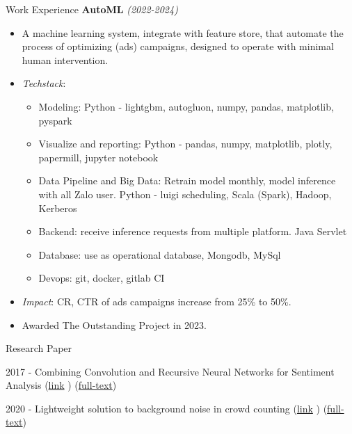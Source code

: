 \documentclass{resume} %
\begin{document}
\begin{rSection}{Work Experience}
\textbf{AutoML} \textit{(2022-2024)}
\begin{itemize}
    \item A machine learning system, integrate with feature store, that automate the process of optimizing (ads) campaigns, designed to operate with minimal human intervention.
    \item \textit{Techstack}:
    \begin{itemize}
        \item Modeling: Python - lightgbm, autogluon, numpy, pandas, matplotlib, pyspark
        \item Visualize and reporting: Python - pandas, numpy, matplotlib, plotly, papermill, jupyter notebook
        \item Data Pipeline and Big Data: Retrain model monthly,  model inference with all Zalo user. Python - luigi scheduling, Scala (Spark), Hadoop, Kerberos
        \item Backend: receive inference requests from multiple platform. Java Servlet
        \item Database: use as operational database, Mongodb, MySql
        \item Devops: git, docker, gitlab CI
    \end{itemize} 
    \item \textit{Impact}: CR, CTR of ads campaigns increase from 25\% to 50\%. 
    \item Awarded The Outstanding Project in 2023.
\end{itemize}

\end{rSection}
\begin{rSection}{Research Paper}

2017 - Combining Convolution and Recursive Neural Networks for Sentiment Analysis (\href{https://dl.acm.org/doi/abs/10.1145/3155133.3155158}{link}  )
(\href{https://github.com/ttpro1995/soICT2017/releases/tag/v1.1}{full-text})

2020 - Lightweight solution to background noise in crowd counting 
(\href{https://ieeexplore.ieee.org/document/9335834}{link}  )
(\href{https://github.com/ttpro1995/NICS2020_paper/releases/tag/v1}{full-text})

\end{rSection}
\end{document}
